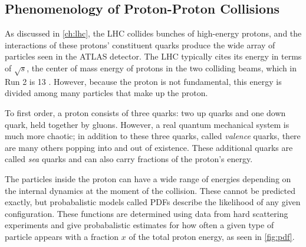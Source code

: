 




\subsection{Phenomenology of Proton-Proton Collisions}
\label{sec:pp_collisions}

As discussed in \autoref{ch:lhc}, the \ac{LHC} collides bunches of high-energy protons, and the interactions of these protons' constituent quarks produce the wide array of particles seen in the \ac{ATLAS} detector. The \ac{LHC} typically cites its energy in terms of $\sqrt{s}$, the center of mass energy of protons in the two colliding beams, which in Run 2 is 13 \tev. However, because the proton is not fundamental, this energy is divided among many particles that make up the proton. 

To first order, a proton consists of three quarks: two up quarks and one down quark, held together by gluons. However, a real quantum mechanical system is much more chaotic; in addition to these three quarks, called \textit{valence} quarks, there are many others popping into and out of existence. These additional quarks are called \textit{sea} quarks and can also carry fractions of the proton's energy.

The particles inside the proton can have a wide range of energies depending on the internal dynamics at the moment of the collision. These cannot be predicted exactly, but probabalistic models called \acfp{PDF} describe the likelihood of any given configuration. These functions are determined using data from hard scattering experiments and give probabalistic estimates for how often a given type of particle appears with a fraction $x$ of the total proton energy, as seen in \autoref{fig:pdf}. 

